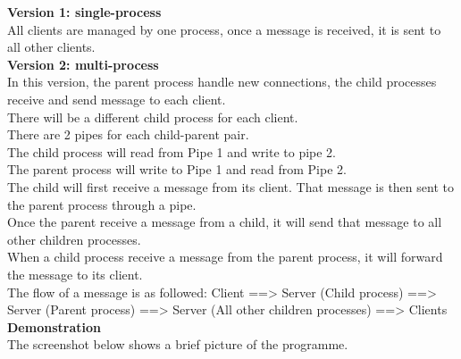 \documentclass{article}
\begin{document}
\textbf{Version 1: single-process}\\
All clients are managed by one process, once a message is received, it is sent to all other clients.\\

\textbf{Version 2: multi-process}\\
In this version, the parent process handle new connections, the child processes receive and send message to each client.\\
There will be a different child process for each client.\\
There are 2 pipes for each child-parent pair.\\
The child process will read from Pipe 1 and write to pipe 2.\\
The parent process will write to Pipe 1 and read from Pipe 2.\\

The child will first receive a message from its client. That message is then sent to the parent process through a pipe.\\
Once the parent receive a message from a child, it will send that message to all other children processes.\\
When a child process receive a message from the parent process, it will forward the message to its client.\\

The flow of a message is as followed: Client ==> Server (Child process) ==> Server (Parent process) ==> Server (All other children processes) ==> Clients\\

\textbf{Demonstration}\\
The screenshot below shows a brief picture of the programme.\\

\begin{center}
\end{center}
\end{document}
